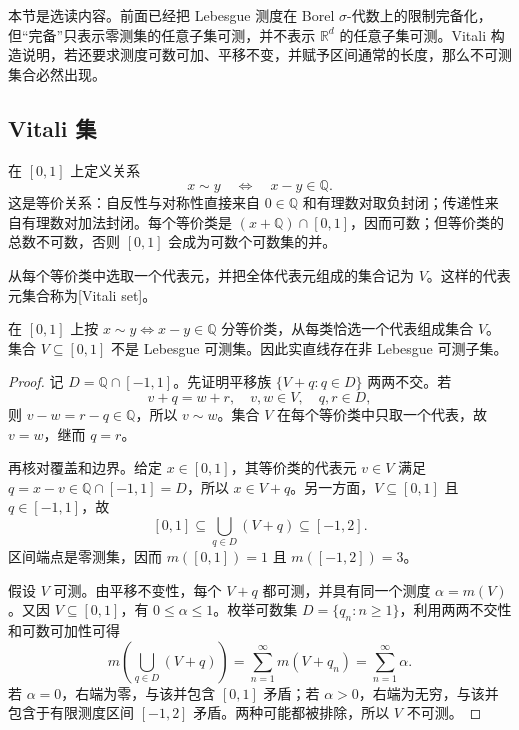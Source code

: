 
本节是选读内容。前面已经把 Lebesgue 测度在 Borel \(\sigma\)-代数上的限制完备化，但“完备”只表示零测集的任意子集可测，并不表示 \(\mathbb R^d\) 的任意子集可测。Vitali 构造说明，若还要求测度可数可加、平移不变，并赋予区间通常的长度，那么不可测集合必然出现。

\subsection{Vitali 集}
\label{b1:subsec:030501}

在 \([0,1]\) 上定义关系
\[
x\sim y
\quad\Longleftrightarrow\quad
x-y\in\mathbb Q.
\]
这是等价关系：自反性与对称性直接来自 \(0\in\mathbb Q\) 和有理数对取负封闭；传递性来自有理数对加法封闭。每个等价类是 \((x+\mathbb Q)\cap[0,1]\)，因而可数；但等价类的总数不可数，否则 \([0,1]\) 会成为可数个可数集的并。

\ProseParagraphBreak

从每个等价类中选取一个代表元，并把全体代表元组成的集合记为 \(V\)。这样的代表元集合称为[Vitali set]。

\begin{theorem}
\label{b1:thm:vitali}
在 \([0,1]\) 上按 \(x\sim y\iff x-y\in\mathbb Q\) 分等价类，从每类恰选一个代表组成集合 \(V\)。集合 \(V\subseteq[0,1]\) 不是 Lebesgue 可测集。因此实直线存在非 Lebesgue 可测子集。
\end{theorem}
\begin{proof}
记 \(D=\mathbb Q\cap[-1,1]\)。先证明平移族 \(\{V+q:q\in D\}\) 两两不交。若
\[
v+q=w+r,
\quad v,w\in V,\quad q,r\in D,
\]
则 \(v-w=r-q\in\mathbb Q\)，所以 \(v\sim w\)。集合 \(V\) 在每个等价类中只取一个代表，故 \(v=w\)，继而 \(q=r\)。

再核对覆盖和边界。给定 \(x\in[0,1]\)，其等价类的代表元 \(v\in V\) 满足
\(q=x-v\in\mathbb Q\cap[-1,1]=D\)，所以 \(x\in V+q\)。另一方面，\(V\subseteq[0,1]\) 且 \(q\in[-1,1]\)，故
\[
[0,1]
\subseteq\bigcup_{q\in D}(V+q)
\subseteq[-1,2].
\]
区间端点是零测集，因而
\(m([0,1])=1\) 且 \(m([-1,2])=3\)。

假设 \(V\) 可测。由平移不变性，每个 \(V+q\) 都可测，并具有同一个测度 \(\alpha=m(V)\)。又因 \(V\subseteq[0,1]\)，有 \(0\leq\alpha\leq1\)。枚举可数集 \(D=\{q_n:n\geq1\}\)，利用两两不交性和可数可加性可得
\[
m\left(\bigcup_{q\in D}(V+q)\right)
=\sum_{n=1}^{\infty}m(V+q_n)
=\sum_{n=1}^{\infty}\alpha.
\]
若 \(\alpha=0\)，右端为零，与该并包含 \([0,1]\) 矛盾；若 \(\alpha>0\)，右端为无穷，与该并包含于有限测度区间 \([-1,2]\) 矛盾。两种可能都被排除，所以 \(V\) 不可测。
\end{proof}

